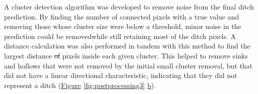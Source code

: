 \documentclass[11pt, review]{elsarticle} %
\providecommand{\DIFaddtex}[1]{{\protect\color{blue}\uwave{#1}}} %
\providecommand{\DIFdeltex}[1]{{\protect\color{red}\sout{#1}}}                      %
\providecommand{\DIFaddbegin}{} %
\providecommand{\DIFaddend}{} %
\providecommand{\DIFdelbegin}{} %
\providecommand{\DIFdelend}{} %
\providecommand{\DIFadd}[1]{\texorpdfstring{\DIFaddtex{#1}}{#1}} %
\providecommand{\DIFdel}[1]{\texorpdfstring{\DIFdeltex{#1}}{}} %
\begin{document}
A cluster detection algorithm was developed to remove noise from the final ditch prediction. By finding the number of connected pixels with a true value and removing those whose cluster size were below a threshold, minor noise in the prediction could be removed\DIFaddbegin \DIFadd{, }\DIFaddend while still retaining most of the ditch pixels. A distance calculation was also performed in tandem with this method to find the largest distance \DIFdelbegin \DIFdel{of }\DIFdelend \DIFaddbegin \DIFadd{between any two }\DIFaddend pixels inside each given cluster. This helped to remove sinks and hollows that were not removed by the initial small cluster removal, but that did not have a linear directional characteristic, indicating that they did not represent a ditch (\hyperref[fig:postprocessing3]{Figure} \ref{fig:postprocessing3} \hyperref[fig:postprocessing3]{b}).
\end{document}
